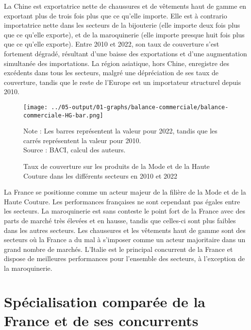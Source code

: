 \documentclass[french,10pt,a4paper]{article}
\begin{document}
La Chine est exportatrice nette de chaussures et de vêtements haut de gamme en exportant plus de trois fois plus que ce qu'elle importe. Elle est à contrario importatrice nette dans les secteurs de la bijouterie (elle importe deux fois plus que ce qu'elle exporte), et de la maroquinerie (elle importe presque huit fois plus que ce qu'elle exporte). Entre 2010 et 2022, son taux de couverture s'est fortement dégradé, résultant d'une baisse des exportations et d'une augmentation simultanée des importations. La région asiatique, hors Chine, enregistre des excédents dans tous les secteurs, malgré une dépréciation de ses taux de couverture, tandis que le reste de l'Europe est un importateur structurel depuis 2010.

\begin{figure}[!h]
  \centering
  \texttt{[image: ../05-output/01-graphs/balance-commerciale/balance-commerciale-HG-bar.png]}
  \captionsetup{justification=justified, singlelinecheck=false, font=small}
  \caption*{Note : Les barres représentent la valeur pour 2022, tandis que les carrés représentent la valeur pour 2010. \\
  Source : BACI, calcul des auteurs.}
  \captionsetup{justification=centering, singlelinecheck=true, font=normalsize}
  \caption{Taux de couverture sur les produits de la Mode et de la Haute Couture dans les différents secteurs en 2010 et 2022}
  \label{fig:balance-commerciale}
\end{figure}

\bigskip

La France se positionne comme un acteur majeur de la filière de la Mode et de la Haute Couture. Les performances françaises ne sont cependant pas égales entre les secteurs. La maroquinerie est sans conteste le point fort de la France avec des parts de marché très élevées et en hausse, tandis que celles-ci sont plus faibles dans les autres secteurs. Les chaussures et les vêtements haut de gamme sont des secteurs où la France a du mal à s'imposer comme un acteur majoritaire dans un grand nombre de marchés. L'Italie est le principal concurrent de la France et dispose de meilleures performances pour l'ensemble des secteurs, à l'exception de la maroquinerie. 






\newpage
{}

\section{Spécialisation comparée de la France et de ses concurrents}
\end{document}

